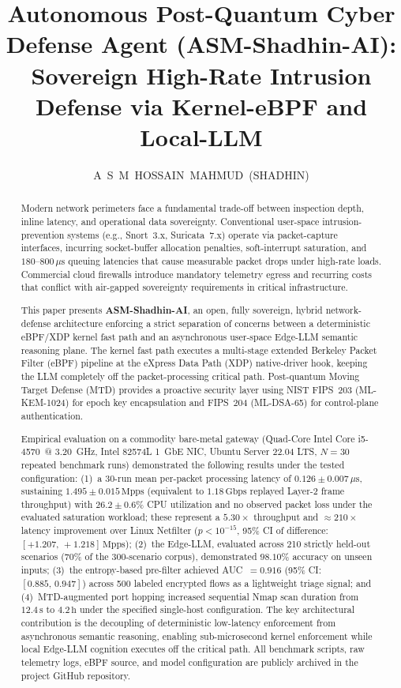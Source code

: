 \documentclass{ieeeaccess}
\title{Autonomous Post-Quantum Cyber Defense Agent (ASM-Shadhin-AI): Sovereign High-Rate Intrusion Defense via Kernel-eBPF and Local-LLM}
\author{\uppercase{A~S~M~Hossain~Mahmud~(Shadhin)}}
\renewcommand{\_}{\textunderscore\allowbreak}
\begin{document}
\begin{abstract}
Modern network perimeters face a fundamental trade-off between inspection
depth, inline latency, and operational data sovereignty. Conventional
user-space intrusion-prevention systems (e.g., Snort~3.x, Suricata~7.x)
operate via packet-capture interfaces, incurring socket-buffer allocation
penalties, soft-interrupt saturation, and $180$--$800\,\mu\text{s}$
queuing latencies that cause measurable packet drops under high-rate loads.
Commercial cloud firewalls introduce mandatory telemetry egress and
recurring costs that conflict with air-gapped sovereignty requirements in
critical infrastructure.

This paper presents \textbf{ASM-Shadhin-AI}, an open, fully sovereign,
hybrid network-defense architecture enforcing a strict separation of concerns
between a deterministic eBPF/XDP kernel fast path and an asynchronous
user-space Edge-LLM semantic reasoning plane. The kernel fast path executes
a multi-stage extended Berkeley Packet Filter (eBPF) pipeline at the eXpress
Data Path (XDP) native-driver hook, keeping the LLM completely off the
packet-processing critical path. Post-quantum Moving Target Defense (MTD)
provides a proactive security layer using NIST FIPS~203 (ML-KEM-1024) for
epoch key encapsulation and FIPS~204 (ML-DSA-65) for control-plane
authentication.

Empirical evaluation on a commodity bare-metal gateway (Quad-Core Intel Core
i5-4570~@ 3.20~GHz, Intel 82574L 1~GbE NIC, Ubuntu Server 22.04 LTS, $N=30$
repeated benchmark runs) demonstrated the following results under the tested
configuration: (1)~a 30-run mean per-packet processing latency of
$0.126 \pm 0.007\,\mu\text{s}$, sustaining $1.495 \pm 0.015\,\text{Mpps}$
(equivalent to $1.18\,\text{Gbps}$ replayed Layer-2 frame throughput) with
$26.2 \pm 0.6\%$ CPU utilization and no observed packet loss under the
evaluated saturation workload; these represent a $5.30\times$ throughput and
$\approx\!210\times$ latency improvement over Linux Netfilter ($p < 10^{-15}$,
95\% CI of difference: $[+1.207,\,+1.218]\,\text{Mpps}$); (2)~the Edge-LLM,
evaluated across 210 strictly held-out scenarios (70\% of the 300-scenario corpus),
demonstrated $98.10\%$ accuracy on unseen inputs; (3)~the entropy-based pre-filter
achieved AUC~$=0.916$ (95\% CI: $[0.885,\,0.947]$) across 500 labeled encrypted
flows as a lightweight triage signal; and (4)~MTD-augmented port hopping increased
sequential Nmap scan duration from $12.4\,\text{s}$ to $4.2\,\text{h}$ under the
specified single-host configuration. The key architectural contribution is the
decoupling of deterministic low-latency enforcement from asynchronous semantic reasoning,
enabling sub-microsecond kernel enforcement while local Edge-LLM cognition executes
off the critical path. All benchmark scripts, raw telemetry logs, eBPF source, and
model configuration are publicly archived in the project GitHub repository.
\end{abstract}
\end{document}
